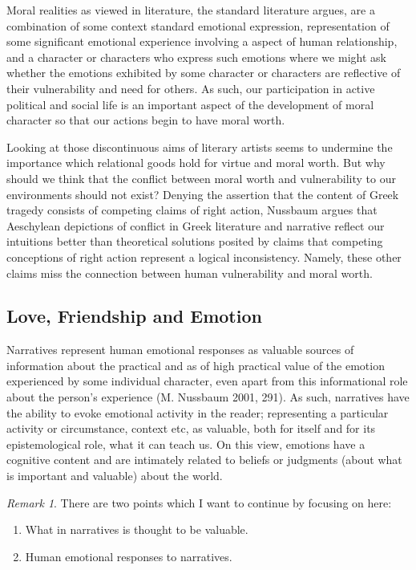 \documentclass[12pt]{book}
\theoremstyle{definition}
\theoremstyle{remark}
\newtheorem{remark}[theorem]{Remark}
\providecommand{\tightlist}{%
  \setlength{\itemsep}{0pt}\setlength{\parskip}{0pt}}
\begin{document}
Moral realities as viewed in literature, the standard literature argues, are a combination of some context standard emotional expression, representation of some significant emotional experience involving a aspect of human relationship, and a character or characters who express such emotions where we might ask whether the emotions exhibited by some character or characters are reflective of their vulnerability and need for others. As such, our participation in active political and social life is an important aspect of the development of moral character so that our actions begin to have moral worth.

Looking at those discontinuous aims of literary artists seems to undermine the importance which relational goods hold for virtue and moral worth. But why should we think that the conflict between moral worth and vulnerability to our environments should not exist? Denying the assertion that the content of Greek tragedy consists of competing claims of right action, Nussbaum argues that Aeschylean depictions of conflict in Greek literature and narrative reflect our intuitions better than theoretical solutions posited by claims that competing conceptions of right action represent a logical inconsistency. Namely, these other claims miss the connection between human vulnerability and moral worth.

\subsection*{Love, Friendship and Emotion}\label{love-friendship-and-emotion}

Narratives represent human emotional responses as valuable sources of information about the practical and as of high practical value of the emotion experienced by some individual character, even apart from this informational role about the person's experience (M. Nussbaum 2001, 291). As such, narratives have the ability to evoke emotional activity in the reader; representing a particular activity or circumstance, context etc, as valuable, both for itself and for its epistemological role, what it can teach us. On this view, emotions have a cognitive content and are intimately related to beliefs or judgments (about what is important and valuable) about the world.

\begin{remark}

\noindent There are two points which I want to continue by focusing on here:

\begin{enumerate}
\def\labelenumi{\arabic{enumi}.}
\tightlist
\item
  What in narratives is thought to be valuable.
\item
  Human emotional responses to narratives.
\end{enumerate}

\end{remark}
\end{document}
